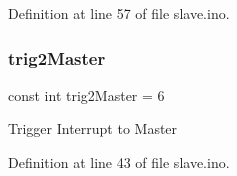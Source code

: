Definition at line 57 of file slave.\+ino.

\mbox{\label{slave_8ino_af78a75bd42bc29651caa8cdaee48181c}} 
\subsubsection{\texorpdfstring{trig2Master}{trig2Master}}
{\footnotesize\ttfamily const int trig2\+Master = 6}

Trigger Interrupt to Master 

Definition at line 43 of file slave.\+ino.

